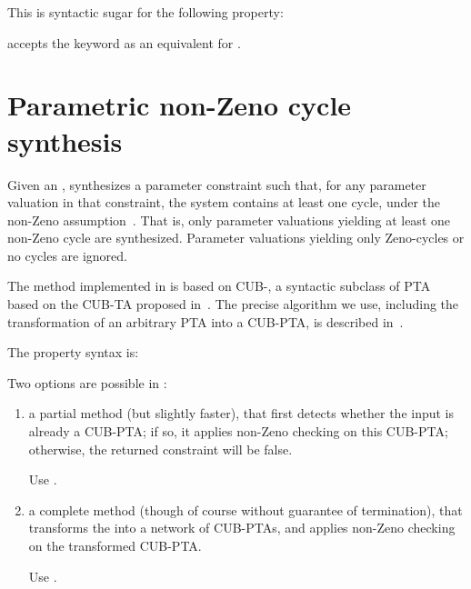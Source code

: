 This is syntactic sugar for the following property:

\begin{syntaxalias}
	\imitator{} accepts the  keyword as an equivalent for .
\end{syntaxalias}



\section{Parametric non-Zeno cycle synthesis}\label{ss:mode:Zeno}

Given an \NIPTA{}, \imitator{} synthesizes a parameter constraint such that, for any parameter valuation in that constraint, the system contains at least one cycle, under the non-Zeno assumption~\cite{ANPS17}.
That is, only parameter valuations yielding at least one non-Zeno cycle are synthesized.
Parameter valuations yielding only Zeno-cycles or no cycles are ignored.

The method implemented in \imitator{} is based on CUB-\IPTA{}, a syntactic subclass of PTA based on the CUB-TA proposed in~\cite{WSWLSDYL15}.
The precise algorithm we use, including the transformation of an arbitrary PTA into a CUB-PTA, is described in~\cite{ANPS17}.

The property syntax is:



Two options are possible in \imitator{}:
\begin{enumerate}
	\item a partial method (but slightly faster), that first detects whether the input \NIPTA{} is already a CUB-PTA; if so, it applies non-Zeno checking on this CUB-PTA; otherwise, the returned constraint will be false.

	      Use .

	\item a complete method (though of course without guarantee of termination), that transforms the \NIPTA{} into a network of CUB-PTAs, and applies non-Zeno checking on the transformed CUB-PTA.

	      Use .

\end{enumerate}

